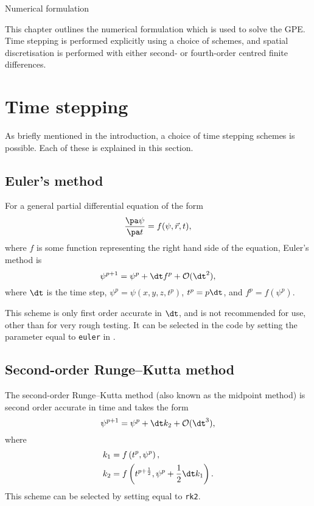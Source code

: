 
\begin{chapter}{\label{cha:numerics}Numerical formulation}

  This chapter outlines the numerical formulation which is used to solve the
  GPE.  Time stepping is performed explicitly using a choice of schemes, and
  spatial discretisation is performed with either second- or fourth-order
  centred finite differences.

  \section{Time stepping}
  As briefly mentioned in the introduction, a choice of time stepping schemes
  is possible.  Each of these is explained in this section.

  \subsection{Euler's method}
  For a general partial differential equation of the form
  \begin{equation*}
    \frac{\pa \psi}{\pa t} = f(\psi, \vec{r}, t),
  \end{equation*}
  where $f$ is some function representing the right hand side of the equation,
  Euler's method is
  \begin{equation*}
    \psi^{p+1} = \psi^{p} + \dt f^{p} + \mathcal{O}(\dt^{2}),
  \end{equation*}
  where $\dt$ is the time step, $\psi^{p} = \psi\left( x, y, z, t^{p}\right)$,
  $t^{p} = p\dt$, and $f^{p} = f\left( \psi^{p} \right)$.

  This scheme is only first order accurate in $\dt$, and is not recommended for
  use, other than for very rough testing.  It can be selected in the code by
  setting the parameter  equal to \verb"euler" in
  .

  \subsection{Second-order Runge--Kutta method}
  The second-order Runge--Kutta method (also known as the midpoint method) is
  second order accurate in time and takes the form
  \begin{equation*}
    \psi^{p+1} = \psi^{p} + \dt k_{2} + \mathcal{O}(\dt^{3}),
  \end{equation*}
  where
  \begin{equation*}
    \begin{aligned}
      k_{1} &= f\left( t^{p}, \psi^{p} \right), \\
      k_{2} &= f\left( t^{p+\frac{1}{2}}, \psi^{p} + \frac{1}{2}\dt k_{1}
      \right).
    \end{aligned}
  \end{equation*}
  This scheme can be selected by setting  equal to \verb"rk2".


\end{chapter}
